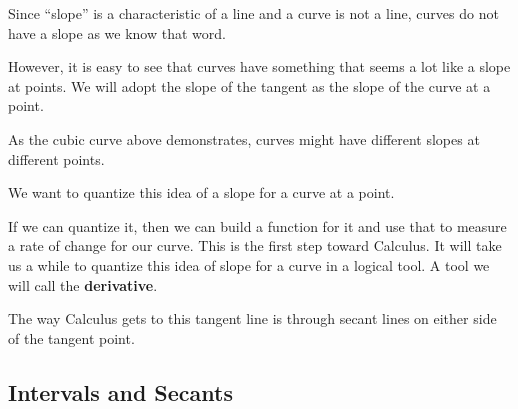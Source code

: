 \documentclass{ximera}
\begin{document}
Since ``slope'' is a characteristic of a line and a curve is not a line, curves do not have a slope as we know that word. 

However, it is easy to see that curves have something that seems a lot like a slope at points. We will adopt the slope of the tangent as the slope of the curve at a point. 

As the cubic curve above demonstrates, curves might have different slopes at different points. 

We want to quantize this idea of a slope for a curve at a point. 

If we can quantize it, then we can build a function for it and use that to measure a rate of change for our curve. This is the first step toward Calculus. It will take us a while to quantize this idea of slope for a curve in a logical tool. A tool we will call the \textbf{derivative}.

The way Calculus gets to this tangent line is through secant lines on either side of the tangent point.




































































\subsection*{Intervals and Secants}
\end{document}
